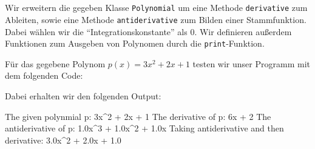 \section{}

Wir erweitern die gegeben Klasse \texttt{Polynomial} um eine Methode \texttt{derivative} zum Ableiten, sowie eine Methode \texttt{antiderivative} zum Bilden einer Stammfunktion.
Dabei wählen wir die \enquote{Integrationskonstante} als $0$.
Wir definieren außerdem Funktionen zum Ausgeben von Polynomen durch die \texttt{print}-Funktion.



Für das gegebene Polynom $p(x) = 3 x^2 + 2 x + 1$ testen wir unser Programm mit dem folgenden Code:



Dabei erhalten wir den folgenden Output:

\begin{consoleoutput}
The given polynmial p:
3x^2 + 2x + 1
The derivative of p:
6x + 2
The antiderivative of p:
1.0x^3 + 1.0x^2 + 1.0x
Taking antiderivative and then derivative:
3.0x^2 + 2.0x + 1.0
\end{consoleoutput}




